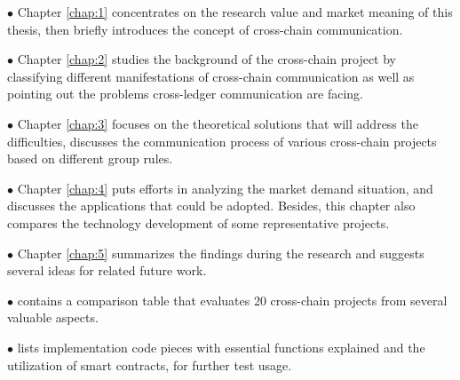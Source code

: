 $\bullet $ Chapter \ref{chap:1} concentrates on the research value and market meaning of this thesis, then briefly introduces the concept of cross-chain communication.

$\bullet $ Chapter \ref{chap:2} studies the background of the cross-chain project by classifying different manifestations of cross-chain communication as well as pointing out the problems cross-ledger communication are facing.

$\bullet $ Chapter \ref{chap:3} focuses on the theoretical solutions that will address the difficulties, discusses the communication process of various cross-chain projects based on different group rules. 

$\bullet $ Chapter \ref{chap:4} puts efforts in analyzing the market demand situation, and discusses the applications that could be adopted. Besides, this chapter also compares the technology development of some representative projects.

$\bullet $ Chapter \ref{chap:5} summarizes the findings during the research and suggests several ideas for related future work.

$\bullet $  contains a comparison table that evaluates 20 cross-chain projects from several valuable aspects.

$\bullet $  lists implementation code pieces with essential functions explained and the utilization of smart contracts, for further test usage.
  